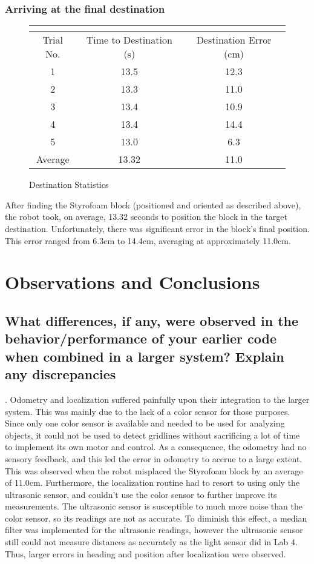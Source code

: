 \documentclass[10pt]{article}
\begin{document}
\subsubsection{Arriving at the final destination}
\begin{figure}[h!t]
\begin{center}
\caption{Destination Statistics}
\begin{tabular}{| c | c | c |}
\multicolumn{3}{c}{} \\ \hline
\rowcolor{dblue}
Trial No. & Time to Destination (s) & Destination Error (cm) \\ \hline
1 & 13.5 & 12.3 \\ \hline
2 & 13.3 & 11.0 \\ \hline
3 & 13.4 & 10.9 \\ \hline
4 & 13.4 & 14.4 \\ \hline
5 & 13.0 & 6.3 \\ \hline
\rowcolor{lred}
Average & 13.32 & 11.0 \\ \hline
\end{tabular}
\end{center}
\end{figure}
After finding the Styrofoam block (positioned and oriented as described above), the robot took, on
average, 13.32 seconds to position the block in the target destination. Unfortunately, there was
significant error in the block's final position. This error ranged from 6.3cm to 14.4cm, averaging
at approximately 11.0cm.

\section{Observations and Conclusions}
\subsection{What differences, if any, were observed in the behavior/performance of your earlier code
when combined in a larger system? Explain any discrepancies}.
Odometry and localization suffered painfully upon their integration to the larger system. This was
mainly due to the lack of a color sensor for those purposes. Since only one color sensor is
available and needed to be used for analyzing objects, it could not be used to detect gridlines
without sacrificing a lot of time to implement its own motor and control. As a consequence, the
odometry had no sensory feedback, and this led the error in odometry to accrue to a large extent.
This was observed when the robot misplaced the Styrofoam block by an average of 11.0cm. Furthermore,
the localization routine had to resort to using only the ultrasonic sensor, and couldn't use the
color sensor to further improve its measurements. The ultrasonic sensor is susceptible to much more
noise than the color sensor, so its readings are not as accurate. To diminish this effect, a median
filter was implemented for the ultrasonic readings, however the ultrasonic sensor still could not
measure distances as accurately as the light sensor did in Lab 4. Thus, larger errors in heading and
position after localization were observed.
\end{document}
